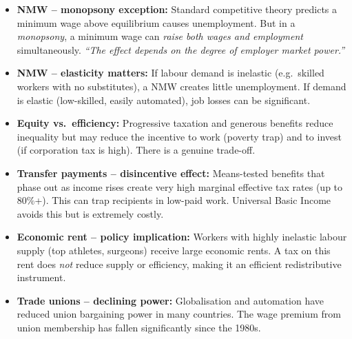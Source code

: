\documentclass[11pt, a4paper, twoside]{book}
\begin{document}
\begin{tcolorbox}[enhanced,colback=EvalBg,colframe=EvalFrame,arc=0pt,boxrule=1pt,title={\bfseries\color{EvalFrame}Evaluation: Labour Markets, Wages and Equity},fonttitle=\small]
\small\RaggedRight
\begin{itemize}[itemsep=2pt,topsep=2pt]
  \item \textbf{NMW -- monopsony exception:} Standard competitive theory predicts a minimum wage above equilibrium causes unemployment. But in a \textit{monopsony}, a minimum wage can \textit{raise both wages and employment} simultaneously. \textit{``The effect depends on the degree of employer market power.''}
  \item \textbf{NMW -- elasticity matters:} If labour demand is inelastic (e.g.\ skilled workers with no substitutes), a NMW creates little unemployment. If demand is elastic (low-skilled, easily automated), job losses can be significant.
  \item \textbf{Equity vs.\ efficiency:} Progressive taxation and generous benefits reduce inequality but may reduce the incentive to work (poverty trap) and to invest (if corporation tax is high). There is a genuine trade-off.
  \item \textbf{Transfer payments -- disincentive effect:} Means-tested benefits that phase out as income rises create very high marginal effective tax rates (up to 80\%+). This can trap recipients in low-paid work. Universal Basic Income avoids this but is extremely costly.
  \item \textbf{Economic rent -- policy implication:} Workers with highly inelastic labour supply (top athletes, surgeons) receive large economic rents. A tax on this rent does \textit{not} reduce supply or efficiency, making it an efficient redistributive instrument.
  \item \textbf{Trade unions -- declining power:} Globalisation and automation have reduced union bargaining power in many countries. The wage premium from union membership has fallen significantly since the 1980s.
\end{itemize}
\end{tcolorbox}
\end{document}
